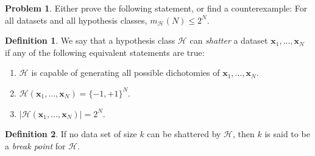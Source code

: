 \documentclass[10pt]{exam}
\theoremstyle{definition}
\newtheorem{problem}{Problem}
\newtheorem{defn}{Definition}
\newtheorem{fact}{Fact}
\newcommand{\R}{\mathbb R}
\newcommand{\x}{\mathbf x}
\newcommand{\mH}{m_{\mathcal H}}
\begin{document}
\newpage
\begin{problem}
    Either prove the following statement, or find a counterexample:
    For all datasets and all hypothesis classes,
        $
        \mH(N) \le 2^N.
        $
\end{problem}

\newpage
\begin{defn}
    We say that a hypothesis class $\mathcal H$ can \emph{shatter} a dataset $\x_1, ..., \x_N$ if any of the following equivalent statements are true:
    \begin{enumerate}
        \item $\mathcal H$ is capable of generating all possible dichotomies of $\x_1, ..., \x_N$.
        \item $\mathcal H(\x_1, ..., \x_N) = \{-1, +1\}^N$.
        \item $\left|\mathcal H(\x_1, ..., \x_N)\right| = 2^N$.
    \end{enumerate}
\end{defn}
\begin{defn}
    If no data set of size $k$ can be shattered by $\mathcal H$, then $k$ is said to be a \emph{break point} for $\mathcal H$.
\end{defn}

\newpage


\end{document}
